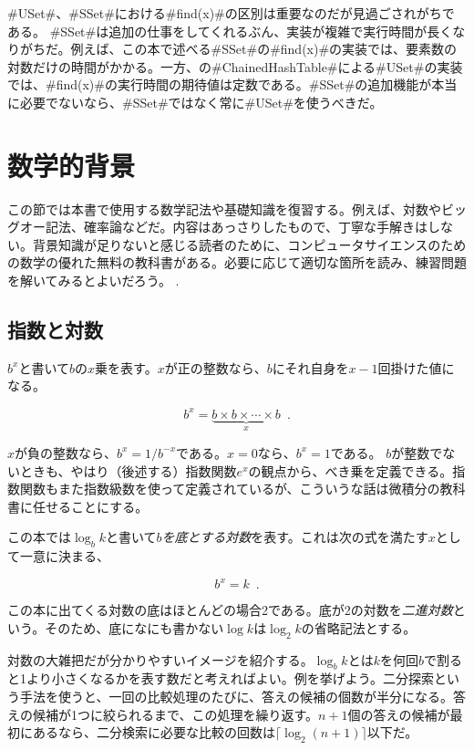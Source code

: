 #USet#、#SSet#における#find(x)#の区別は重要なのだが見過ごされがちである。 #SSet#は追加の仕事をしてくれるぶん、実装が複雑で実行時間が長くなりがちだ。例えば、この本で述べる#SSet#の#find(x)#の実装では、要素数の対数だけの時間がかかる。一方、の#ChainedHashTable#による#USet#の実装では、#find(x)#の実行時間の期待値は定数である。#SSet#の追加機能が本当に必要でないなら、#SSet#ではなく常に#USet#を使うべきだ。

\section{数学的背景}
この節では本書で使用する数学記法や基礎知識を復習する。例えば、対数やビッグオー記法、確率論などだ。内容はあっさりしたもので、丁寧な手解きはしない。背景知識が足りないと感じる読者のために、コンピュータサイエンスのための数学の優れた無料の教科書がある。必要に応じて適切な箇所を読み、練習問題を解いてみるとよいだろう。
\cite{llm11}.

\subsection{指数と対数}

$b^x$と書いて$b$の$x$乗を表す。$x$が正の整数なら、$b$にそれ自身を$x-1$回掛けた値になる。

\[
    b^x = \underbrace{b\times b\times \cdots \times b}_{x} \enspace .
\]

$ x $が負の整数なら、$b^x=1/b^{-x}$である。$x=0$なら、$b^x=1$である。
$b$が整数でないときも、やはり（後述する）指数関数$e^x$の観点から、べき乗を定義できる。指数関数もまた指数級数を使って定義されているが、こういうな話は微積分の教科書に任せることにする。

この本では$\log_b k$と書いて\emph{$b$を底とする対数}を表す。これは次の式を満たす$x$として一意に決まる、

\[
    b^{x} = k  \enspace .
\]

この本に出てくる対数の底はほとんどの場合2である。底が2の対数を\emph{二進対数}という。そのため、底になにも書かない$\log k$は$\log_2 k$の省略記法とする。
%
%

対数の大雑把だが分かりやすいイメージを紹介する。$\log_b k$とは$k$を何回$b$で割ると1より小さくなるかを表す数だと考えればよい。例を挙げよう。二分探索という手法を使うと、一回の比較処理のたびに、答えの候補の個数が半分になる。答えの候補が1つに絞られるまで、この処理を繰り返す。$n+1$個の答えの候補が最初にあるなら、二分検索に必要な比較の回数は$\lceil \log_2(n+1) \rceil$以下だ。

